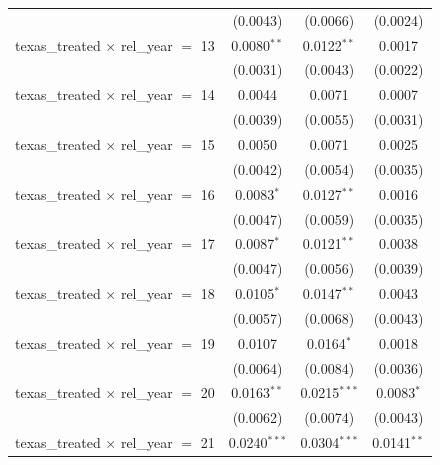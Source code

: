 \begin{tabular}{lccc}
                                                & (0.0043)              & (0.0066)               & (0.0024)\\   
   texas\_treated $\times$ rel\_year $=$ 13     & 0.0080$^{**}$         & 0.0122$^{**}$          & 0.0017\\   
                                                & (0.0031)              & (0.0043)               & (0.0022)\\   
   texas\_treated $\times$ rel\_year $=$ 14     & 0.0044                & 0.0071                 & 0.0007\\   
                                                & (0.0039)              & (0.0055)               & (0.0031)\\   
   texas\_treated $\times$ rel\_year $=$ 15     & 0.0050                & 0.0071                 & 0.0025\\   
                                                & (0.0042)              & (0.0054)               & (0.0035)\\   
   texas\_treated $\times$ rel\_year $=$ 16     & 0.0083$^{*}$          & 0.0127$^{**}$          & 0.0016\\   
                                                & (0.0047)              & (0.0059)               & (0.0035)\\   
   texas\_treated $\times$ rel\_year $=$ 17     & 0.0087$^{*}$          & 0.0121$^{**}$          & 0.0038\\   
                                                & (0.0047)              & (0.0056)               & (0.0039)\\   
   texas\_treated $\times$ rel\_year $=$ 18     & 0.0105$^{*}$          & 0.0147$^{**}$          & 0.0043\\   
                                                & (0.0057)              & (0.0068)               & (0.0043)\\   
   texas\_treated $\times$ rel\_year $=$ 19     & 0.0107                & 0.0164$^{*}$           & 0.0018\\   
                                                & (0.0064)              & (0.0084)               & (0.0036)\\   
   texas\_treated $\times$ rel\_year $=$ 20     & 0.0163$^{**}$         & 0.0215$^{***}$         & 0.0083$^{*}$\\   
                                                & (0.0062)              & (0.0074)               & (0.0043)\\   
   texas\_treated $\times$ rel\_year $=$ 21     & 0.0240$^{***}$        & 0.0304$^{***}$         & 0.0141$^{**}$\\   

\end{tabular}
